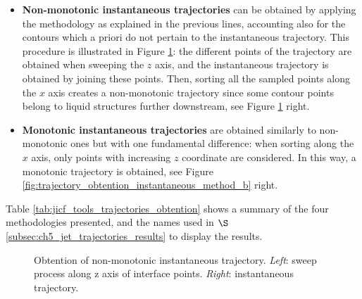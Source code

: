 \begin{itemize}

	\item \textbf{Non-monotonic instantaneous trajectories} can be obtained by applying the methodology as explained in the previous lines, accounting also for the contours which a priori do not pertain to the instantaneous trajectory. This procedure is illustrated in Figure \ref{fig:trajectory_obtention_instantaneous_method_a}: the different points of the trajectory are obtained when sweeping the $z$ axis, and the instantaneous trajectory is obtained by joining these points. Then, sorting all the sampled points along the $x$ axis creates a non-monotonic trajectory since some contour points belong to liquid structures further downstream, see Figure \ref{fig:trajectory_obtention_instantaneous_method_a} right.



\item \textbf{Monotonic instantaneous trajectories} are obtained similarly to non-monotonic ones but with one fundamental difference: when sorting along the $x$ axis, only points with increasing $z$ coordinate are considered. In this way, a monotonic trajectory is obtained, see Figure \ref{fig:trajectory_obtention_instantaneous_method_b} right. 




\end{itemize}

Table \ref{tab:jicf_tools_trajectories_obtention} shows a summary of the four methodologies presented, and the names used in $\S$\ref{subsec:ch5_jet_trajectories_results} to display the results.

\clearpage

\begin{figure}[ht]
     \centering
     \begin{subfigure}[b]{0.45\textwidth}
         \centering
     \end{subfigure}
     \begin{subfigure}[b]{0.45\textwidth}
         \centering
     \end{subfigure}
        \caption[Obtention of non-monotonic instantaneous trajectory]{Obtention of non-monotonic instantaneous trajectory. \textsl{Left}: sweep process along z axis of interface points. \textsl{Right}: instantaneous trajectory.}
        \label{fig:trajectory_obtention_instantaneous_method_a}
\end{figure}


